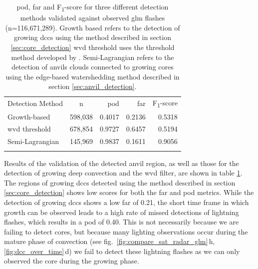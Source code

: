 \begin{table}[tb]
\centering
\begin{tabular}{lcrrr}
\tophline
Detection Method            & n         & \acrshort{pod}    & \acrshort{far}    & F\textsubscript{1}-score \\ 
\middlehline
Growth-based                & 598,038   & 0.4017            & 0.2136            & 0.5318  \\
\acrshort{wvd} threshold    & 678,854   & 0.9727            & 0.6457            & 0.5194  \\
Semi-Lagrangian             & 145,969   & 0.9837            & 0.1611            & 0.9056 \\
\bottomhline
\end{tabular}
\caption[
\acrshort{pod}, \acrshort{far} and F\textsubscript{1}-score for three different detection methods validated against observed \acrshort{glm} flashes
]{
\acrshort{pod}, \acrshort{far} and F\textsubscript{1}-score for three different detection methods validated against observed \acrshort{glm} flashes (n=116,671,289). Growth based refers to the detection of growing \acrshort{dcc}s using the method described in section \ref{sec:core_detection} \acrshort{wvd} threshold uses the threshold method developed by \citet{muller_role_2018}. Semi-Lagrangian refers to the detection of anvils clouds connected to growing cores using the edge-based watershedding method described in section \ref{sec:anvil_detection}.
} %
\label{table:validation}
\end{table}


Results of the validation of the detected anvil region, as well as those for the detection of growing deep convection and the \acrshort{wvd} filter, are shown in table \ref{table:validation}.
The regions of growing \acrshort{dcc}s detected using the method described in section \ref{sec:core_detection} shows low scores for both the \acrshort{far} and \acrshort{pod} metrics.
While the detection of growing \acrshort{dcc}s shows a low \acrshort{far} of 0.21, the short time frame in which growth can be observed leads to a high rate of missed detections of lightning flashes, which results in a \acrshort{pod} of 0.40.
This is not necessarily because we are failing to detect cores, but because many lighting observations occur during the mature phase of convection (see fig.~\ref{fig:compare_sat_radar_glm}\,h, \ref{fig:dcc_over_time}\,d) we fail to detect these lightning flashes as we can only observed the core during the growing phase.

